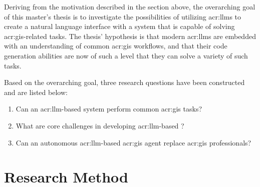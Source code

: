 \begin{comment}
Potentially, how well the goals have been met (and how well the research questions have been answered)
is a theme that you should return to towards the end of the thesis (so in Chapter~\ref{cha:conclusion} and/or Chapter~\ref{cha:discussion}).

For a Specialisation Project, the goal would primarily be to get up to speed with the research field, so the research questions will rather be
limited to exploring what the state-of-the-art is, what methods and data have been used, etc.
A secondary goal of the specialisation is to frame the research questions and goals of the Master's Thesis.
Note that a major difference between the Specialisation Project and the Master's Thesis is that the Master's Thesis work \textit{has\/} to
introduce new research.
Of course the Specialisation Project can also introduce novel work, but there is no such requirement --- and most commonly it does not,
since the core of the project really is to figure out what is ``old'' before you can introduce something which is new.
\end{comment}

Deriving from the motivation described in the section above, the overarching goal of this master's thesis is to investigate the possibilities of utilizing \glspl{acr:llm} to create a natural language interface with a system that is capable of solving \acrshort{acr:gis}-related tasks. The thesis' hypothesis is that modern \glspl{acr:llm} are embedded with an understanding of common \acrshort{acr:gis} workflows, and that their code generation abilities are now of such a level that they can solve a variety of such tasks.

Based on the overarching goal, three research questions have been constructed and are listed below:

\begin{enumerate}
    \item Can an \gls{acr:llm}-based system perform common \acrshort{acr:gis} tasks? \label{rq:gis-question-answering}
    \item What are core challenges in developing \acrshort{acr:llm}-based ? \label{rq:development-challenges}
    \item Can an autonomous \acrshort{acr:llm}-based \acrshort{acr:gis} agent replace \acrshort{acr:gis} professionals? \label{rq:replaing-gis-professionals}
\end{enumerate}

\section{Research Method}
\label{sec:researchMethod}

